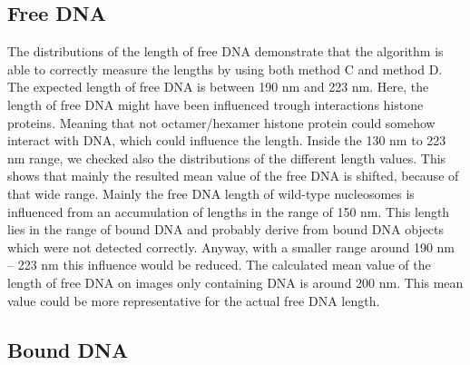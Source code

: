 \documentclass{article}
\begin{document}
\subsection{Free DNA}

The distributions of the length of free DNA demonstrate that the algorithm is able to correctly measure the lengths by using both method C and method D. The expected length of free DNA is between 190 nm and 223 nm. Here, the length of free DNA might have been influenced trough interactions histone proteins. Meaning that not octamer/hexamer histone protein could somehow interact with DNA, which could influence the length. Inside the 130 nm to 223 nm range, we checked also the distributions of the different length values. This shows that mainly the resulted mean value of the free DNA is shifted, because of that wide range. Mainly the free DNA length of wild-type nucleosomes is influenced from an accumulation of lengths in the range of 150 nm. This length lies in the range of bound DNA and probably derive from bound DNA objects which were not detected correctly. Anyway, with a smaller range around 190 nm – 223 nm this influence would be reduced. The calculated mean value of the length of free DNA on images only containing DNA is around 200 nm. This mean value could be more representative for the actual free DNA length.

\subsection{Bound DNA}
\end{document}
